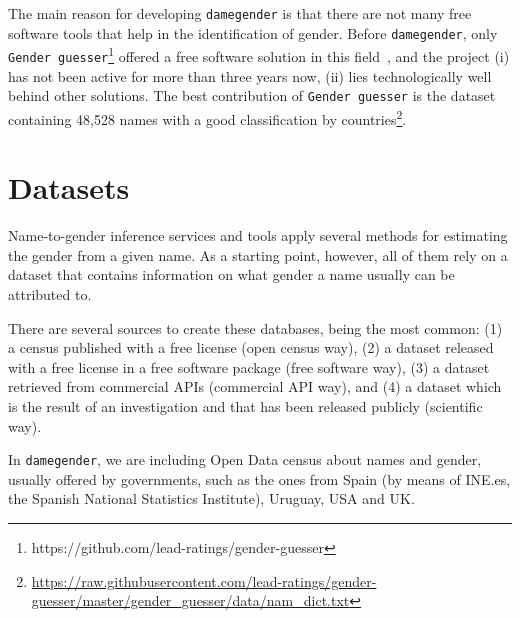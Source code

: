 \documentclass[a4paper]{article}
\begin{document}

The main reason for developing \texttt{damegender} is that there are not many free software tools that help in the identification of gender. 
Before \texttt{damegender}, only \texttt{Gender guesser}\footnote{https://github.com/lead-ratings/gender-guesser} offered a free software solution in this field~\cite{krawetz2006gender}, and the project (i) has not been active for more than three years now, (ii) lies technologically well behind other solutions.
The best contribution of \texttt{Gender guesser} is the dataset containing 48,528 names with a good classification by countries\footnote{\url{https://raw.githubusercontent.com/lead-ratings/gender-guesser/master/gender_guesser/data/nam_dict.txt}}.

\section{Datasets}
\label{sec:datasets}

Name-to-gender inference services and tools apply several methods for estimating the gender from a given name. 
As a starting point, however, all of them rely on a dataset that contains information on what gender a name usually can be attributed to.

There are several sources to create these databases, being the most common:  
(1) a census published with a free license (open census way), 
(2) a dataset released with a free license in a free software package (free software way), 
(3) a dataset retrieved from commercial APIs (commercial API way), and
(4) a dataset which is the result of an investigation and that has been released publicly (scientific way).

In \texttt{damegender}, we are including Open Data census about names and gender, usually offered by governments, such as the ones from Spain (by means of INE.es, the Spanish National Statistics Institute), Uruguay, USA and UK. 
\end{document}
